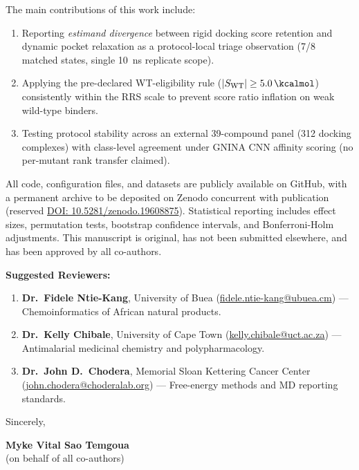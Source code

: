 \documentclass[11pt,letterpaper]{article}
\begin{document}
The main contributions of this work include:
\begin{enumerate}
  \item Reporting \textit{estimand divergence} between rigid docking score retention and dynamic pocket relaxation as a protocol-local triage observation (7/8 matched states, single \qty{10}{\ns} replicate scope).
  \item Applying the pre-declared WT-eligibility rule ($|S_{\mathrm{WT}}| \ge \qty{5.0}{\kcalmol}$) consistently within the RRS scale to prevent score ratio inflation on weak wild-type binders.
  \item Testing protocol stability across an external 39-compound panel (\num{312} docking complexes) with class-level agreement under GNINA CNN affinity scoring (no per-mutant rank transfer claimed).
\end{enumerate}

All code, configuration files, and datasets are publicly available on GitHub, with a permanent archive to be deposited on Zenodo concurrent with publication (reserved \href{https://doi.org/10.5281/zenodo.19608875}{DOI: 10.5281/zenodo.19608875}). Statistical reporting includes effect sizes, permutation tests, bootstrap confidence intervals, and Bonferroni-Holm adjustments. This manuscript is original, has not been submitted elsewhere, and has been approved by all co-authors.

\vspace{0.4em}
\noindent\textbf{Suggested Reviewers:}
\begin{enumerate}
  \item \textbf{Dr.\ Fidele Ntie-Kang}, University of Buea (\href{mailto:fidele.ntie-kang@ubuea.cm}{fidele.ntie-kang@ubuea.cm}) --- Chemoinformatics of African natural products.
  \item \textbf{Dr.\ Kelly Chibale}, University of Cape Town (\href{mailto:kelly.chibale@uct.ac.za}{kelly.chibale@uct.ac.za}) --- Antimalarial medicinal chemistry and polypharmacology.
  \item \textbf{Dr.\ John D.\ Chodera}, Memorial Sloan Kettering Cancer Center (\href{mailto:john.chodera@choderalab.org}{john.chodera@choderalab.org}) --- Free-energy methods and MD reporting standards.
\end{enumerate}

\vspace{0.4em}
\noindent Sincerely,

\vspace{0.8em}

\noindent \textbf{Myke Vital Sao Temgoua} \\
(on behalf of all co-authors)
\end{document}
